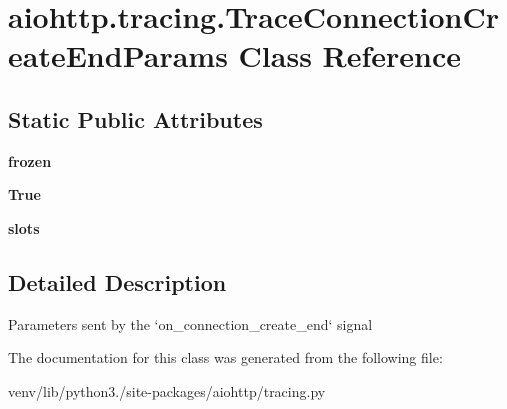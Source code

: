 \hypertarget{classaiohttp_1_1tracing_1_1_trace_connection_create_end_params}{}\section{aiohttp.\+tracing.\+Trace\+Connection\+Create\+End\+Params Class Reference}
\label{classaiohttp_1_1tracing_1_1_trace_connection_create_end_params}
\subsection*{Static Public Attributes}
\begin{DoxyCompactItemize}
\item 
\mbox{\label{classaiohttp_1_1tracing_1_1_trace_connection_create_end_params_a87dde79258dcbc288014039a076e697f}} 
{\bfseries frozen}
\item 
\mbox{\label{classaiohttp_1_1tracing_1_1_trace_connection_create_end_params_a08f25b32c631f63646482490839b0cf0}} 
{\bfseries True}
\item 
\mbox{\label{classaiohttp_1_1tracing_1_1_trace_connection_create_end_params_adb1d58087ecafae9f53fd1b62f6498ab}} 
{\bfseries slots}
\end{DoxyCompactItemize}


\subsection{Detailed Description}
\begin{DoxyVerb}Parameters sent by the `on_connection_create_end` signal\end{DoxyVerb}
 

The documentation for this class was generated from the following file\+:\begin{DoxyCompactItemize}
\item 
venv/lib/python3./site-\/packages/aiohttp/tracing.\+py\end{DoxyCompactItemize}
